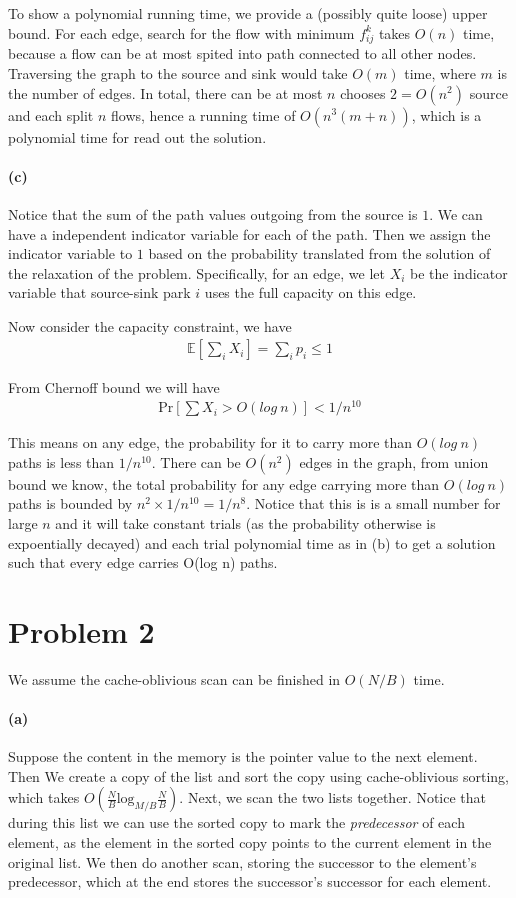\documentclass[12pt]{article}
\begin{document}
To show a polynomial running time, we provide a (possibly quite loose) upper bound. For each edge, search for the flow with minimum $f_{ij}^k$ takes $O(n)$ time, because a flow can be at most spited into path connected to all other nodes. Traversing the graph to the source and sink would take $O(m)$ time, where $m$ is the number of edges. In total, there can be at most $n$ chooses $2 = O(n^2)$ source and each split $n$ flows, hence a running time of $O(n^3(m + n))$, which is a polynomial time for read out the solution.

\paragraph{(c)} Notice that the sum of the path values outgoing from the source is $1$. We can have a independent indicator variable for each of the path. Then we assign the indicator variable to $1$ based on the probability translated from the solution of the relaxation of the problem. Specifically, for an edge, we let $X_i$ be the indicator variable that source-sink park $i$ uses the full capacity on this edge. 

Now consider the capacity constraint, we have
\begin{align*}
\mathbb{E}\left[\sum_i X_i\right] = \sum_i p_i \leq 1
\end{align*}

From Chernoff bound we will have 
\begin{align*}
\text{Pr}\left[\sum X_i > O(log\:n)\right] < 1/n^{10}
\end{align*}

This means on any edge, the probability for it to carry more than $O(log\: n)$ paths is less than $1/n^{10}$. There can be $O(n^2)$ edges in the graph, from union bound we know, the total probability for any edge carrying more than $O(log\: n)$ paths is bounded by $n^2 \times 1/n^{10} = 1/n^8$. Notice that this is is a small number for large $n$ and it will take constant trials (as the probability otherwise is expoentially decayed) and each trial polynomial time as in (b) to get a solution such that every edge carries O(log n) paths.

\newpage
\section*{Problem 2} We assume the cache-oblivious scan can be finished in $O(N/B)$ time. 
\paragraph{(a)} Suppose the content in the memory is the pointer value to the next element. Then We create a copy of the list and sort the copy using cache-oblivious sorting, which takes $O(\frac{N}{B}\text{log}_{M/B}\frac{N}{B})$. Next, we scan the two lists together. Notice that during this list we can use the sorted copy to mark the \emph{predecessor} of each element, as the element in the sorted copy points to the current element in the original list. We then do another scan, storing the successor to the element's predecessor, which at the end stores the successor's successor for each element. 
\end{document}
